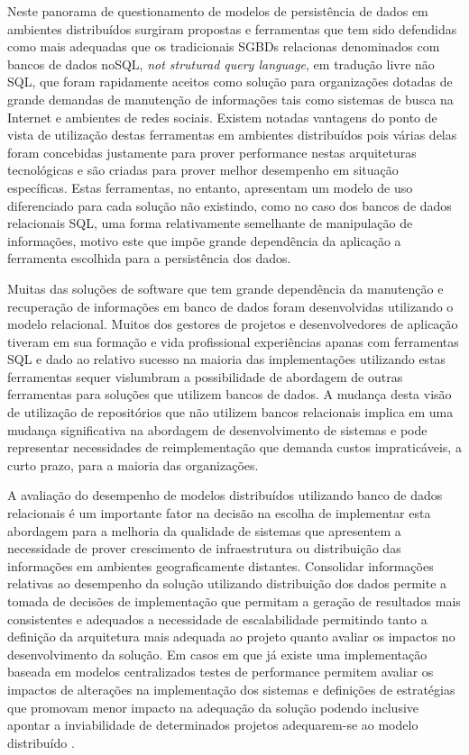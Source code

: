 \documentclass[12pt, a4paper]{article}
\begin{document}
Neste panorama de questionamento de modelos de persistência de dados em ambientes distribuídos surgiram 
propostas e ferramentas que tem sido defendidas como mais adequadas que os tradicionais SGBDs relacionas
denominados com bancos de dados noSQL, \textit{not struturad query language}, em tradução livre não SQL, que foram
rapidamente aceitos como solução para organizações dotadas de grande demandas de manutenção de informações
tais como sistemas de busca na Internet e ambientes de redes sociais. Existem notadas vantagens do ponto
de vista de utilização destas ferramentas em ambientes distribuídos pois várias delas foram concebidas
justamente para prover performance nestas arquiteturas tecnológicas e são criadas para prover melhor
desempenho em situação específicas. Estas ferramentas, no entanto, apresentam um modelo de uso diferenciado
para cada solução não existindo, como no caso dos bancos de dados relacionais SQL, uma forma relativamente
semelhante de manipulação de informações, motivo este que impõe grande dependência da aplicação a
ferramenta escolhida para a persistência dos dados.

Muitas das soluções de software que tem grande dependência da manutenção e recuperação de informações
em banco de dados foram desenvolvidas utilizando o modelo relacional. Muitos dos gestores de projetos 
e desenvolvedores de aplicação tiveram em sua formação e vida profissional experiências apanas
com ferramentas SQL e dado ao relativo sucesso na maioria das implementações utilizando estas ferramentas
sequer vislumbram a possibilidade de abordagem de outras ferramentas para soluções que utilizem 
bancos de dados. A mudança desta visão de utilização de repositórios que não utilizem bancos relacionais
implica em uma mudança significativa na abordagem de desenvolvimento de sistemas e pode representar
necessidades de reimplementação que demanda custos impraticáveis, a curto prazo, para a maioria das
organizações.

A avaliação do desempenho de modelos distribuídos utilizando banco de dados relacionais é um importante
fator na decisão na escolha de implementar esta abordagem para a melhoria da qualidade de sistemas
que apresentem a necessidade de prover crescimento de infraestrutura ou distribuição das informações 
em ambientes geograficamente distantes. Consolidar informações relativas ao desempenho da solução 
utilizando distribuição dos dados permite a tomada de decisões de implementação que permitam a 
geração de resultados mais consistentes e adequados a necessidade de escalabilidade permitindo tanto
a definição da arquitetura mais adequada ao projeto quanto avaliar os impactos no desenvolvimento
da solução. Em casos em que já existe uma implementação baseada em modelos centralizados testes de 
performance permitem avaliar os impactos de alterações na implementação dos sistemas e definições
de estratégias que promovam menor impacto na adequação da solução podendo inclusive apontar a inviabilidade
de determinados projetos adequarem-se ao modelo distribuído \cite{lin2011tenzing}.
\end{document}
